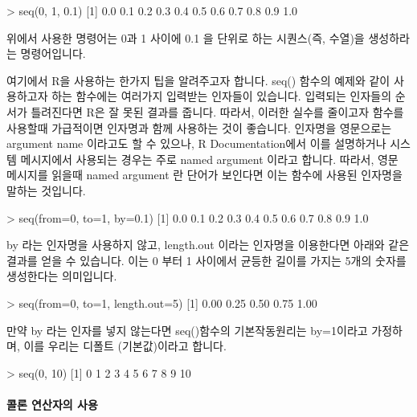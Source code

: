 \documentclass{book}
\begin{document}
\begin{Schunk}
\begin{Soutput}
> seq(0, 1, 0.1)
 [1] 0.0 0.1 0.2 0.3 0.4 0.5 0.6 0.7 0.8 0.9 1.0
\end{Soutput}
\end{Schunk}

위에서 사용한 명령어는 0과 1 사이에 0.1 을 단위로 하는 시퀀스(즉, 수열)을 생성하라는 명령어입니다. 

여기에서 R을 사용하는 한가지 팁을 알려주고자 합니다.
seq() 함수의 예제와 같이 사용하고자 하는 함수에는 여러가지 입력받는 인자들이 있습니다. 
입력되는 인자들의 순서가 틀려진다면 R은 잘 못된 결과를 줍니다. 
따라서, 이러한 실수를 줄이고자 함수를 사용할때 가급적이면 인자명과 함께 사용하는 것이 좋습니다.  
인자명을 영문으로는 argument name 이라고도 할 수 있으나, R Documentation에서 이를 설명하거나 시스템 메시지에서 사용되는 경우는 주로 named argument 이라고 합니다. 
따라서, 영문 메시지를 읽을때 named argument 란 단어가 보인다면 이는 함수에 사용된 인자명을 말하는 것입니다. 

\begin{Schunk}
\begin{Soutput}
> seq(from=0, to=1, by=0.1)
 [1] 0.0 0.1 0.2 0.3 0.4 0.5 0.6 0.7 0.8 0.9 1.0
\end{Soutput}
\end{Schunk}

by 라는 인자명을 사용하지 않고, length.out 이라는 인자명을 이용한다면 아래와 같은 결과를 얻을 수 있습니다. 
이는 0 부터 1 사이에서 균등한 길이를 가지는 5개의 숫자를 생성한다는 의미입니다. 

\begin{Schunk}
\begin{Soutput}
> seq(from=0, to=1, length.out=5)
[1] 0.00 0.25 0.50 0.75 1.00
\end{Soutput}
\end{Schunk}


만약 by 라는 인자를 넣지 않는다면 seq()함수의 기본작동원리는 by=1이라고 가정하며, 이를 우리는 디폴트 (기본값)이라고 합니다. 

\begin{Schunk}
\begin{Soutput}
> seq(0, 10)
 [1]  0  1  2  3  4  5  6  7  8  9 10	
\end{Soutput}
\end{Schunk}

\paragraph{콜론 연산자의 사용} 
\end{document}
